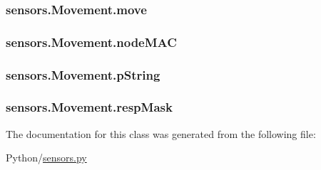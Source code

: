 \subsubsection[{\texorpdfstring{move}{move}}]{\setlength{\rightskip}{0pt plus 5cm}sensors.\+Movement.\+move}\hypertarget{classsensors_1_1Movement_a11256fb90a76350e4b908a71c72d1e99}{}\label{classsensors_1_1Movement_a11256fb90a76350e4b908a71c72d1e99}
\subsubsection[{\texorpdfstring{node\+M\+AC}{nodeMAC}}]{\setlength{\rightskip}{0pt plus 5cm}sensors.\+Movement.\+node\+M\+AC}\hypertarget{classsensors_1_1Movement_abf7c369726a2aacb0e03accdbdcfca14}{}\label{classsensors_1_1Movement_abf7c369726a2aacb0e03accdbdcfca14}
\subsubsection[{\texorpdfstring{p\+String}{pString}}]{\setlength{\rightskip}{0pt plus 5cm}sensors.\+Movement.\+p\+String}\hypertarget{classsensors_1_1Movement_a630da6fa554c8a0d816067d804c02baa}{}\label{classsensors_1_1Movement_a630da6fa554c8a0d816067d804c02baa}
\subsubsection[{\texorpdfstring{resp\+Mask}{respMask}}]{\setlength{\rightskip}{0pt plus 5cm}sensors.\+Movement.\+resp\+Mask}\hypertarget{classsensors_1_1Movement_a4f97ac0c0891b427c241df101d7b36ee}{}\label{classsensors_1_1Movement_a4f97ac0c0891b427c241df101d7b36ee}


The documentation for this class was generated from the following file\+:\begin{DoxyCompactItemize}
\item 
Python/\hyperlink{sensors_8py}{sensors.\+py}\end{DoxyCompactItemize}
